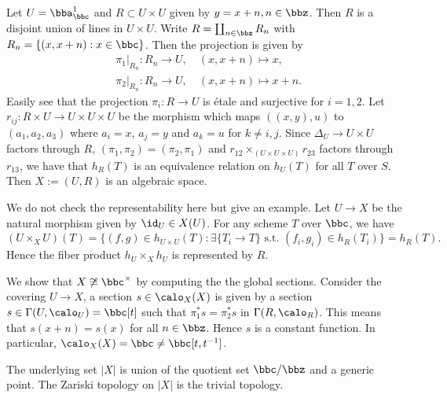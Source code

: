     \begin{example}\label{eg:C/Z_as_algebraic_space}
        Let \(U = \bba_\bbc^1\) and \(R \subset U \times U\) given by \(y=x+n, n \in \bbz\).
        Then \(R\) is a disjoint union of lines in \(U \times U\).
        Write \(R = \coprod_{n\in \bbz} R_n\) with \(R_n = \{(x,x+n): x \in \bbc\}\).
        Then the projection is given by 
        \begin{align*}
            &\pi_1|_{R_n}:R_n \to U, \quad (x,x+n) \mapsto x, \\
            &\pi_2|_{R_n}:R_n \to U, \quad (x,x+n) \mapsto x+n.
        \end{align*} 
        Easily see that the projection \(\pi_i: R \to U\) is \'etale and surjective for \(i=1,2\).
        Let \(r_{ij}:R \times U \to U \times U \times U\) be the morphism which maps \(((x,y),u)\) to \((a_1,a_2,a_3)\) where \(a_i = x\), \(a_j = y\) and \(a_k = u\) for \(k \neq i,j\).
        Since \(\Delta_U \to U\times U\) factors through \(R\), \((\pi_1,\pi_2) = (\pi_2,\pi_1)\) and 
        \(r_{12} \times_{(U\times U\times U)} r_{23}\) factors through \(r_{13}\), 
        we have that \(h_R(T)\) is an equivalence relation on \(h_U(T)\) for all \(T\) over \(S\).
        Then \(X := (U,R)\) is an algebraic space.
        
        We do not check the representability here but give an example.
        Let \(U \to X\) be the natural morphism given by \(\id_U \in X(U)\).
        For any scheme \(T\) over \(\bbc\), we have
        \[ (U\times_X U)(T) = \{(f,g) \in h_{U\times U}(T): \exists \{T_i \to T\} \text{ s.t. } (f_i,g_i) \in h_R(T_i) \} = h_R(T). \]
        Hence the fiber product \(h_U \times_X h_U\) is represented by \(R\).
        
        We show that \(X \not\cong \bbc^{\times}\) by computing the the global sections.
        Consider the covering \(U \to X\), a section \(s \in \calo_X(X)\) is given by a section \(s \in \Gamma(U,\calo_U) = \bbc[t]\) such that \(\pi_1^*s = \pi_2^*s\) in \(\Gamma(R,\calo_R)\).
        This means that \(s(x+n) = s(x)\) for all \(n \in \bbz\).
        Hence \(s\) is a constant function.
        In particular, \(\calo_X(X) = \bbc \neq \bbc[t,t^{-1}]\).

        The underlying set \(|X|\) is union of the quotient set \(\bbc/\bbz\) and a generic point.
        The Zariski topology on \(|X|\) is the trivial topology.
    \end{example}

